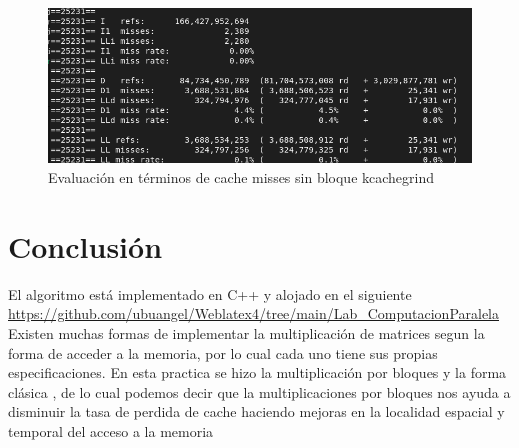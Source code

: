\documentclass{article}
\begin{document}
\begin{enumerate}
\begin{figure}[H]
    \centering
   \includegraphics[width=0.8\linewidth]{imagenes/Captura de pantalla de 2023-09-24 22-36-46.png}
   \caption{Evaluación en términos de cache misses sin bloque kcachegrind}
\end{figure}








\end{enumerate}




\begin{figure}
    \centering
\end{figure}




\newpage








	
\section{Conclusión}

El algoritmo está implementado en C++ y alojado en el siguiente  \url{https://github.com/ubuangel/Weblatex4/tree/main/Lab_ComputacionParalela}
Existen muchas formas de implementar la multiplicación de matrices segun la forma de acceder a 
 la memoria, por lo cual cada uno tiene sus propias especificaciones. En esta practica se
hizo la multiplicación por bloques y la forma clásica , de lo cual podemos decir que la multiplicaciones por
bloques nos ayuda a disminuir la tasa de perdida de cache haciendo mejoras en la localidad espacial
y temporal del acceso a la memoria \cite{pacheco2011introduction}

\vspace{20 mm}






    
    
\end{document}
